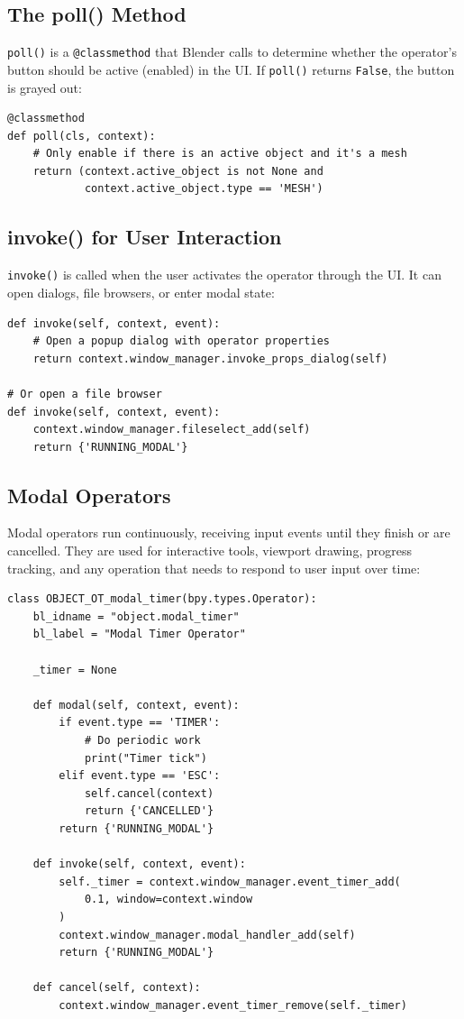 \subsection{The poll() Method}

\texttt{poll()} is a \texttt{@classmethod} that Blender calls to determine whether the operator's button should be active (enabled) in the UI. If \texttt{poll()} returns \texttt{False}, the button is grayed out:

\begin{lstlisting}
@classmethod
def poll(cls, context):
    # Only enable if there is an active object and it's a mesh
    return (context.active_object is not None and
            context.active_object.type == 'MESH')
\end{lstlisting}

\subsection{invoke() for User Interaction}

\texttt{invoke()} is called when the user activates the operator through the UI. It can open dialogs, file browsers, or enter modal state:

\begin{lstlisting}
def invoke(self, context, event):
    # Open a popup dialog with operator properties
    return context.window_manager.invoke_props_dialog(self)

# Or open a file browser
def invoke(self, context, event):
    context.window_manager.fileselect_add(self)
    return {'RUNNING_MODAL'}
\end{lstlisting}

\subsection{Modal Operators}

Modal operators run continuously, receiving input events until they finish or are cancelled. They are used for interactive tools, viewport drawing, progress tracking, and any operation that needs to respond to user input over time:

\begin{lstlisting}
class OBJECT_OT_modal_timer(bpy.types.Operator):
    bl_idname = "object.modal_timer"
    bl_label = "Modal Timer Operator"

    _timer = None

    def modal(self, context, event):
        if event.type == 'TIMER':
            # Do periodic work
            print("Timer tick")
        elif event.type == 'ESC':
            self.cancel(context)
            return {'CANCELLED'}
        return {'RUNNING_MODAL'}

    def invoke(self, context, event):
        self._timer = context.window_manager.event_timer_add(
            0.1, window=context.window
        )
        context.window_manager.modal_handler_add(self)
        return {'RUNNING_MODAL'}

    def cancel(self, context):
        context.window_manager.event_timer_remove(self._timer)
\end{lstlisting}

